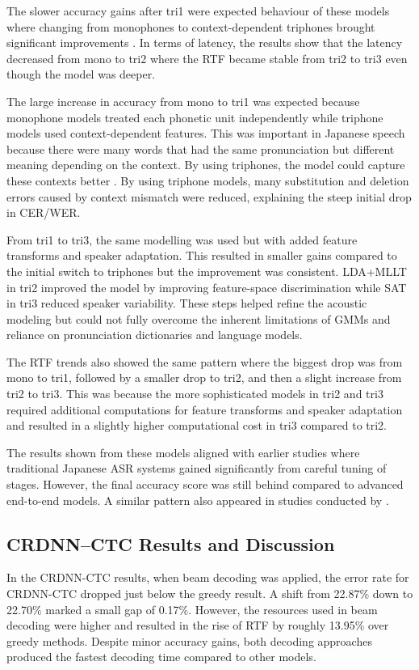 The slower accuracy gains after tri1 were expected behaviour of these models where changing from monophones to context-dependent triphones brought significant improvements \parencite{KaldiCSJResults2015}. In terms of latency, the results show that the latency decreased from mono to tri2 where the RTF became stable from tri2 to tri3 even though the model was deeper. 

The large increase in accuracy from mono to tri1 was expected because monophone models treated each phonetic unit independently while triphone models used context-dependent features. This was important in Japanese speech because there were many words that had the same pronunciation but different meaning depending on the context. By using triphones, the model could capture these contexts better \parencite{kaldi2011}. By using triphone models, many substitution and deletion errors caused by context mismatch were reduced, explaining the steep initial drop in CER/WER.

From tri1 to tri3, the same modelling was used but with added feature transforms and speaker adaptation. This resulted in smaller gains compared to the initial switch to triphones but the improvement was consistent. LDA+MLLT in tri2 improved the model by improving feature-space discrimination while SAT in tri3 reduced speaker variability. These steps helped refine the acoustic modeling but could not fully overcome the inherent limitations of GMMs and reliance on pronunciation dictionaries and language models.

The RTF trends also showed the same pattern where the biggest drop was from mono to tri1, followed by a smaller drop to tri2, and then a slight increase from tri2 to tri3. This was because the more sophisticated models in tri2 and tri3 required additional computations for feature transforms and speaker adaptation and resulted in a slightly higher computational cost in tri3 compared to tri2.

The results shown from these models aligned with earlier studies where traditional Japanese ASR systems gained significantly from careful tuning of stages. However, the final accuracy score was still behind compared to advanced end-to-end models. A similar pattern also appeared in studies conducted by \parencite{ando2021, KaldiCSJResults2015}.


\subsection{CRDNN--CTC Results and Discussion}
\label{sec:crdnn_results}
In the CRDNN-CTC results, when beam decoding was applied, the error rate for CRDNN-CTC dropped just below the greedy result. A shift from 22.87\% down to 22.70\% marked a small gap of 0.17\%. However, the resources used in beam decoding were higher and resulted in the rise of RTF by roughly 13.95\% over greedy methods. Despite minor accuracy gains, both decoding approaches produced the fastest decoding time compared to other models.

